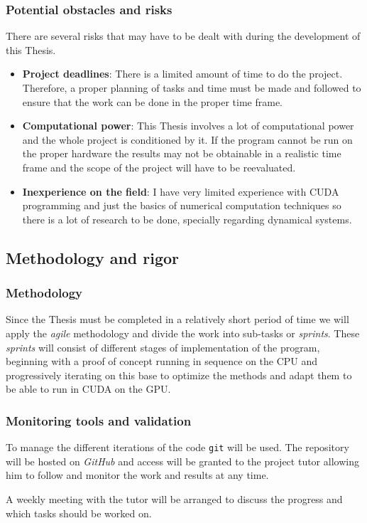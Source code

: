 \subsubsection{Potential obstacles and risks}

There are several risks that may have to be dealt with during the development of this Thesis.

\begin{itemize}
    \item \textbf{Project deadlines}: There is a limited amount of time to do
        the project. Therefore, a proper planning of tasks and time must be made
        and followed to ensure that the work can be done in the proper time
        frame.
    \item \textbf{Computational power}: This Thesis involves a lot of
        computational power and the whole project is conditioned by it. If the
        program cannot be run on the proper hardware the results may not be
        obtainable in a realistic time frame and the scope of the project will
        have to be reevaluated.
    \item \textbf{Inexperience on the field}: I have very limited experience
        with CUDA programming and just the basics of numerical computation
        techniques so there is a lot of research to be done, specially regarding
        dynamical systems.
\end{itemize}

\pagebreak
\subsection{Methodology and rigor}


\subsubsection{Methodology}

Since the Thesis must be completed in a relatively short period of time we will
apply the \emph{agile} methodology and divide the work into sub-tasks or
\emph{sprints}. These \emph{sprints} will consist of different stages of
implementation of the program, beginning with a proof of concept running in
sequence on the CPU and progressively iterating on this base to optimize the
methods and adapt them to be able to run in CUDA on the GPU.

\subsubsection{Monitoring tools and validation}

To manage the different iterations of the code \texttt{git} will be used. The
repository will be hosted on \emph{GitHub} and access will be granted to the
project tutor allowing him to follow and monitor the work and results at any
time.

A weekly meeting with the tutor will be arranged to discuss the progress and
which tasks should be worked on.
